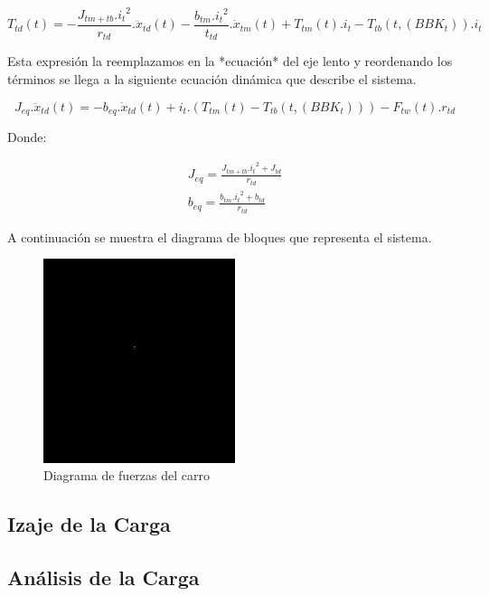 \begin{equation}
    T_{td}(t) = - \frac{J_{tm+tb}. {i_t}^2}{r_{td}}.\ddot{x}_{td}(t) - \frac{b_{tm}. {i_t}^2}{t_{td}}.\dot{x}_{tm}(t) + T_{tm}(t).i_t - T_{tb}(t, (BBK_t)).i_t
\end{equation}

Esta expresión la reemplazamos en la *ecuación* del eje lento y reordenando los 
términos se llega a la siguiente ecuación dinámica que describe el sistema.

\begin{equation}
    J_{eq}. \ddot{x}_{td}(t) = - b_{eq}.\dot{x}_{td}(t) +i_t.(T_{tm}(t) - T_{tb}(t, (BBK_t))) - F_{tw}(t).r_{td}
\end{equation}

Donde:

\begin{equation*}
    \begin{split}
        J_{eq} = \frac{{J_{tm+tb}. {i_t}^2 + J_{td} }}{r_{td}}\\
        b_{eq} = \frac{{b_{tm}. {i_t}^2 + b_{td}}}{r_{td}}
    \end{split}
\end{equation*}

A continuación se muestra el diagrama de bloques que representa el sistema.

\begin{figure}[H]
    \centering
    \includegraphics[width=0.5\textwidth]{img/NADA.png}
    \caption{Diagrama de fuerzas del carro}
\end{figure}


\subsection{Izaje de la Carga}

\subsection{Análisis de la Carga}